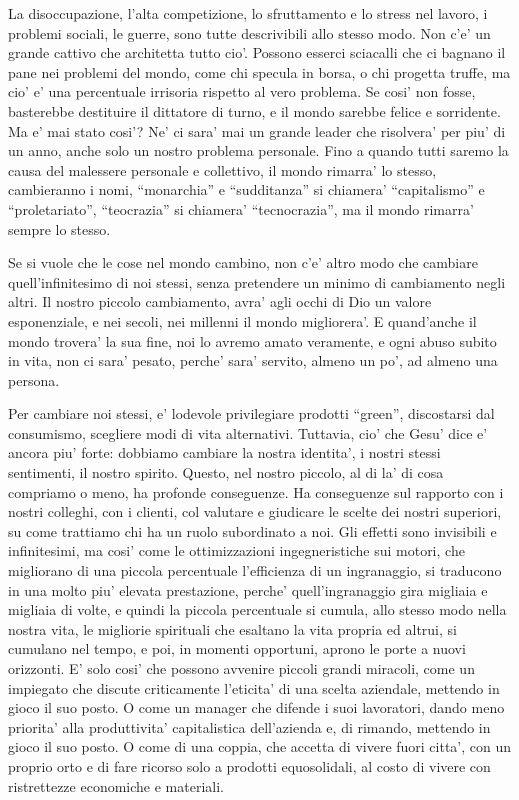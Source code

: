 La disoccupazione, l'alta competizione, lo sfruttamento e lo stress nel lavoro, i problemi sociali, le guerre, sono tutte descrivibili allo stesso modo. Non c'e' un grande cattivo che architetta tutto cio'. Possono esserci sciacalli che ci bagnano il pane nei problemi del mondo, come chi specula in borsa, o chi progetta truffe, ma cio' e' una percentuale irrisoria rispetto al vero problema. Se cosi' non fosse, basterebbe destituire il dittatore di turno, e il mondo sarebbe felice e sorridente. Ma e' mai stato cosi'? Ne' ci sara' mai un grande leader che risolvera' per piu' di un anno, anche solo un nostro problema personale. Fino a quando tutti saremo la causa del malessere personale e collettivo, il mondo rimarra' lo stesso, cambieranno i nomi, ``monarchia'' e ``sudditanza'' si chiamera' ``capitalismo'' e ``proletariato'', ``teocrazia'' si chiamera' ``tecnocrazia'', ma il mondo rimarra' sempre lo stesso.

Se si vuole che le cose nel mondo cambino, non c'e' altro modo che cambiare quell'infinitesimo di noi stessi, senza pretendere un minimo di cambiamento negli altri. Il nostro piccolo cambiamento, avra' agli occhi di Dio un valore esponenziale, e nei secoli, nei millenni il mondo migliorera'. E quand'anche il mondo trovera' la sua fine, noi lo avremo amato veramente, e ogni abuso subito in vita, non ci sara' pesato, perche' sara' servito, almeno un po', ad almeno una persona.

Per cambiare noi stessi, e' lodevole privilegiare prodotti ``green'', discostarsi dal consumismo, scegliere modi di vita alternativi. Tuttavia, cio' che Gesu' dice e' ancora piu' forte: dobbiamo cambiare la nostra identita', i nostri stessi sentimenti, il nostro spirito. Questo, nel nostro piccolo, al di la' di cosa compriamo o meno, ha profonde conseguenze. Ha conseguenze sul rapporto con i nostri colleghi, con i clienti, col valutare e giudicare le scelte dei nostri superiori, su come trattiamo chi ha un ruolo subordinato a noi. Gli effetti sono invisibili e infinitesimi, ma cosi' come le ottimizzazioni ingegneristiche sui motori, che migliorano di una piccola percentuale l'efficienza di un ingranaggio, si traducono in una molto piu' elevata prestazione, perche' quell'ingranaggio gira migliaia e migliaia di volte, e quindi la piccola percentuale si cumula, allo stesso modo nella nostra vita, le migliorie spirituali che esaltano la vita propria ed altrui, si cumulano nel tempo, e poi, in momenti opportuni, aprono le porte a nuovi orizzonti. E' solo cosi' che possono avvenire piccoli grandi miracoli, come un impiegato che discute criticamente l'eticita' di una scelta aziendale, mettendo in gioco il suo posto. O come un manager che difende i suoi lavoratori, dando meno priorita' alla produttivita' capitalistica dell'azienda e, di rimando, mettendo in gioco il suo posto. O come di una coppia, che accetta di vivere fuori citta', con un proprio orto e di fare ricorso solo a prodotti equosolidali, al costo di vivere con ristrettezze economiche e materiali.

